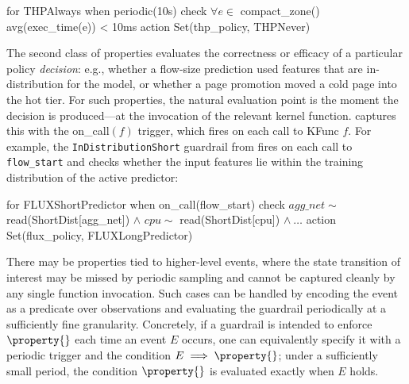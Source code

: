 \begin{dslbox}[title={Guardrail~\theguardcount: CompactionOverhead}, glabel=lst:compaction-overhead]
for THPAlways
when periodic(10s)
check $\forall e \in$ compact_zone() avg(exec_time(e)) < 10ms
action Set(thp_policy, THPNever)
\end{dslbox}

The second class of properties evaluates the correctness or efficacy of a particular policy \emph{decision}: e.g., whether a flow-size prediction used features that are in-distribution for the model, or whether a page promotion moved a cold page into the hot tier.
For such properties, the natural evaluation point is the moment the decision is produced---at the invocation of the relevant kernel function.
\lang captures this with the {\sf on\_call}$(f)$ trigger, which fires on each call to \textsf{KFunc} $f$.
For example, the {\tt InDistributionShort} guardrail from  fires on each call to {\tt flow\_start} and checks whether the input features lie within the training distribution of the active predictor:

\begin{dslbox}[title={Guardrail~\theguardcount: InDistributionShort}, glabel=lst:in-dist-short]
for FLUXShortPredictor
when on_call(flow_start)
check $agg\_net \sim$ read(ShortDist[agg_net]) $\wedge$
      $cpu \sim$ read(ShortDist[cpu]) $\wedge\ \dots$
action Set(flux_policy, FLUXLongPredictor)
\end{dslbox}

There may be properties tied to higher-level events, where the state transition of interest may be missed by periodic sampling and cannot be captured cleanly by any single function invocation.
Such cases can be handled by encoding the event as a predicate over observations and evaluating the guardrail periodically at a sufficiently fine granularity.
Concretely, if a guardrail is intended to enforce $\property{}$ each time an event $E$ occurs, one can equivalently specify it with a periodic trigger and the condition $E\implies\property{}$; under a sufficiently small period, the condition $\property{}$ is evaluated exactly when $E$ holds.

